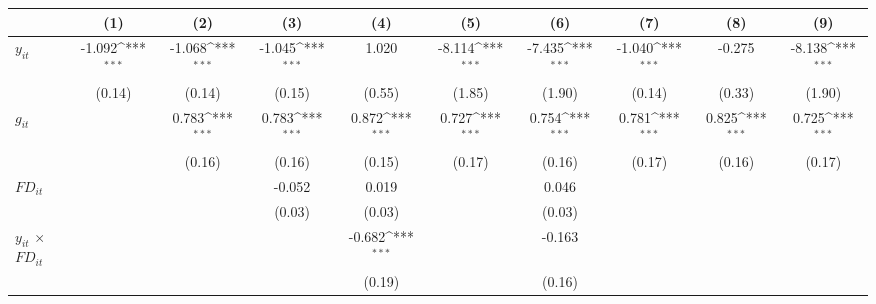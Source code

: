 \documentclass[12pt, a4paper]{article}
\begin{document}
	\begin{table}[htbp]
	\centering
	\scriptsize
	\setlength\tabcolsep{1pt}	
	\begin{threeparttable}
		{
			\def\sym#1{\ifmmode^{#1}\else\(^{#1}\)\fi}
			\begin{tabular}{l*{9}{c}}
				\hline\hline
				&\multicolumn{1}{c}{(1)}&\multicolumn{1}{c}{(2)}&\multicolumn{1}{c}{(3)}&\multicolumn{1}{c}{(4)}&\multicolumn{1}{c}{(5)}&\multicolumn{1}{c}{(6)}&\multicolumn{1}{c}{(7)}&\multicolumn{1}{c}{(8)}&\multicolumn{1}{c}{(9)}\\
				\hline
				$y_{it}$               &      -1.092\sym{***}&      -1.068\sym{***}&      -1.045\sym{***}&       1.020         &      -8.114\sym{***}&      -7.435\sym{***}&      -1.040\sym{***}&      -0.275         &      -8.138\sym{***}\\
				&      (0.14)         &      (0.14)         &      (0.15)         &      (0.55)         &      (1.85)         &      (1.90)         &      (0.14)         &      (0.33)         &      (1.90)         \\
				$g_{it}$             &                     &       0.783\sym{***}&       0.783\sym{***}&       0.872\sym{***}&       0.727\sym{***}&       0.754\sym{***}&       0.781\sym{***}&       0.825\sym{***}&       0.725\sym{***}\\
				&                     &      (0.16)         &      (0.16)         &      (0.15)         &      (0.17)         &      (0.16)         &      (0.17)         &      (0.16)         &      (0.17)         \\
				$FD_{it}$                &                     &                     &      -0.052         &       0.019         &                     &       0.046         &                     &                     &                     \\
				&                     &                     &      (0.03)         &      (0.03)         &                     &      (0.03)         &                     &                     &                     \\
				$y_{it}$ $\times$ $FD_{it}$ &                     &                     &                     &      -0.682\sym{***}&                     &      -0.163         &                     &                     &                     \\
				&                     &                     &                     &      (0.19)         &                     &      (0.16)         &                     &                     &                     \\

\end{tabular}}
\end{threeparttable}
\end{table}
\end{document}

